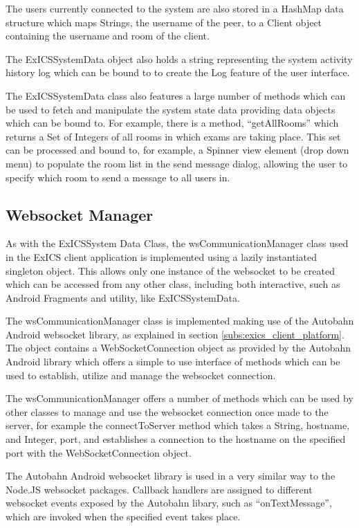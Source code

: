 The users currently connected to the system are also stored in a HashMap data structure which maps Strings, the username of the peer, to a Client object containing the username and room of the client.

The ExICSSystemData object also holds a string representing the system activity history log which can be bound to to create the Log feature of the user interface.

The ExICSSystemData class also features a large number of methods which can be used to fetch and manipulate the system state data providing data objects which can be bound to.  For example, there is a method, ``getAllRooms'' which returns a Set of Integers of all rooms in which exams are taking place.  This set can be processed and bound to, for example, a Spinner view element (drop down menu) to populate the room list in the send message dialog, allowing the user to specify which room to send a message to all users in.

\FloatBarrier

\subsection{Websocket Manager}

As with the ExICSSystem Data Class, the wsCommunicationManager class used in the ExICS client application is implemented using a lazily instantiated singleton object.  This allows only one instance of the websocket to be created which can be accessed from any other class, including both interactive, such as Android Fragments and utility, like ExICSSystemData.

The wsCommunicationManager class is implemented making use of the Autobahn Android websocket library, as explained in section \ref{subs:exics_client_platform}.  The object contains a WebSocketConnection object as provided by the Autobahn Android library which offers a simple to use interface of methods which can be used to establish, utilize and manage the websocket connection.

The wsCommunicationManager offers a number of methods which can be used by other classes to manage and use the websocket connection once made to the server, for example the connectToServer method which takes a String, hostname, and Integer, port, and establishes a connection to the hostname on the specified port with the WebSocketConnection object.

The Autobahn Android websocket library is used in a very similar way to the Node.JS websocket packages.  Callback handlers are assigned to different websocket events exposed by the Autobahn libary, such as ``onTextMessage'', which are invoked when the specified event takes place.

